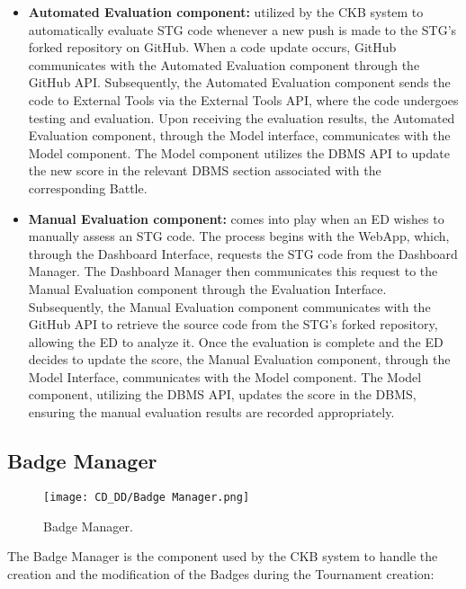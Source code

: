 \begin{itemize}
    \item \textbf{Automated Evaluation component:} utilized by the CKB system to automatically evaluate STG code whenever a new push is made to the STG's forked repository on GitHub. When a code update occurs, GitHub communicates with the Automated Evaluation component through the GitHub API. Subsequently, the Automated Evaluation component sends the code to External Tools via the External Tools API, where the code undergoes testing and evaluation. Upon receiving the evaluation results, the Automated Evaluation component, through the Model interface, communicates with the Model component. The Model component utilizes the DBMS API to update the new score in the relevant DBMS section associated with the corresponding Battle.
    \item \textbf{Manual Evaluation component:} comes into play when an ED wishes to manually assess an STG code. The process begins with the WebApp, which, through the Dashboard Interface, requests the STG code from the Dashboard Manager. The Dashboard Manager then communicates this request to the Manual Evaluation component through the Evaluation Interface. Subsequently, the Manual Evaluation component communicates with the GitHub API to retrieve the source code from the STG's forked repository, allowing the ED to analyze it. Once the evaluation is complete and the ED decides to update the score, the Manual Evaluation component, through the Model Interface, communicates with the Model component. The Model component, utilizing the DBMS API, updates the score in the DBMS, ensuring the manual evaluation results are recorded appropriately.
\end{itemize}

\subsection{Badge Manager}
\label{subsec:badge_manager}%

\begin{figure}[H]
    \begin{center}
        \texttt{[image: CD\_DD/Badge Manager.png]}
        \caption{Badge Manager.}
        \label{fig:badge_manager}%
    \end{center}
\end{figure}

\noindent The Badge Manager is the component used by the CKB system to handle the creation and the modification of the Badges during the Tournament creation:

